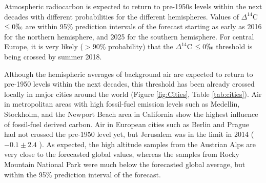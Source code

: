 \documentclass[a4paper, 11pt]{article}
\begin{document}

Atmospheric radiocarbon is expected to return to pre-1950s levels within the next decades with different probabilities for the different hemispheres. Values of $\Delta^{14}$C $\leq 0 \permil$ are within 95\% prediction intervals of the forecast starting as early as 2016 for the northern hemisphere, and 2025 for the southern hemisphere. For central Europe, it is very likely ($> 90$\% probability) that the $\Delta^{14}$C $\leq 0 \permil$ threshold is being crossed by summer 2018.



Although the hemispheric averages of background air are expected to return to pre-1950 levels within the next decades, this threshold has been already crossed locally in major cities around the world (Figure \ref{fig:Cities}, Table \ref{tab:cities}). Air in metropolitan areas with high fossil-fuel emission levels such as Medell\'in, Stockholm, and the Newport Beach area in California show the highest influence of fossil-fuel derived carbon. 
Air in European cities such as Berlin and Prague had not crossed the pre-1950 level yet, but Jerusalem was in the limit in 2014 ($-0.1 \pm 2.4$ \permil). As expected, the high altitude samples from the Austrian Alps are very close to the forecasted global values, whereas the samples from Rocky Mountain National Park were much below the forecasted global average, but within the 95\% prediction interval of the forecast.
\end{document}
